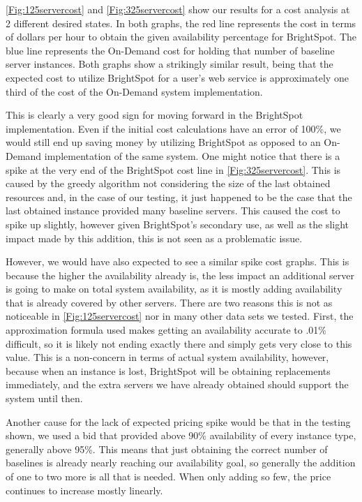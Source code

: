 \documentclass[thesis,proposal]{umassthesis}  %
\begin{document}
\ref{Fig:125servercost} and \ref{Fig:325servercost} show our results for a cost analysis at 2 different desired states. In both graphs, the red line represents the cost in terms of dollars per hour to obtain the given availability percentage for BrightSpot. The blue line represents the On-Demand cost for holding that number of baseline server instances. Both graphs show a strikingly similar result, being that the expected cost to utilize BrightSpot for a user's web service is approximately one third of the cost of the On-Demand system implementation. \par

This is clearly a very good sign for moving forward in the BrightSpot implementation. Even if the initial cost calculations have an error of 100\%, we would still end up saving money by utilizing BrightSpot as opposed to an On-Demand implementation of the same system. One might notice that there is a spike at the very end of the BrightSpot cost line in \ref{Fig:325servercost}. This is caused by the greedy algorithm not considering the size of the last obtained resources and, in the case of our testing, it just happened to be the case that the last obtained instance provided many baseline servers. This caused the cost to spike up slightly, however given BrightSpot's secondary use, as well as the slight impact made by this addition, this is not seen as a problematic issue.\par

However, we would have also expected to see a similar spike cost graphs. This is because the higher the availability already is, the less impact an additional server is going to make on total system availability, as it is mostly adding availability that is already covered by other servers. There are two reasons this is not as noticeable in \ref{Fig:125servercost} nor in many other data sets we tested. First, the approximation formula used makes getting an availability accurate to .01\% difficult, so it is likely not ending exactly there and simply gets very close to this value. This is a non-concern in terms of actual system availability, however, because when an instance is lost, BrightSpot will be obtaining replacements immediately, and the extra servers we have already obtained should support the system until then.\par

Another cause for the lack of expected pricing spike would be that in the testing shown, we used a bid that provided above 90\% availability of every instance type, generally above 95\%. This means that just obtaining the correct number of baselines is already nearly reaching our availability goal, so generally the addition of one to two more is all that is needed. When only adding so few, the price continues to increase mostly linearly.
\end{document}
